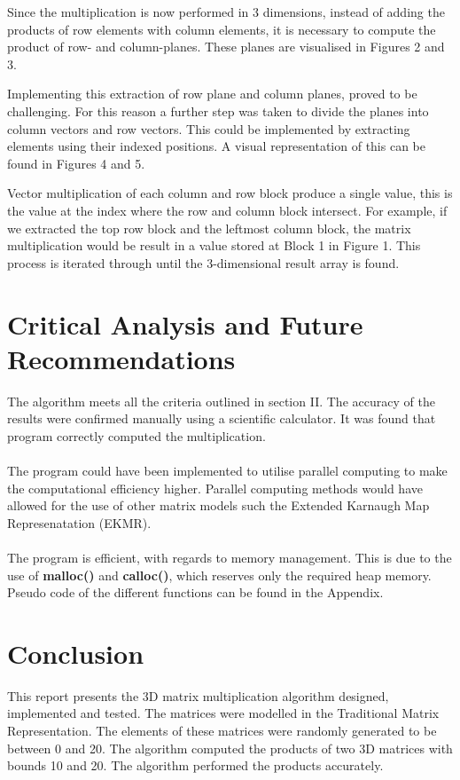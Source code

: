 \documentclass[a4paper, 11pt, onecolumn, conference]{IEEEtran}      %
\begin{document}
Since the multiplication is now performed in 3 dimensions, instead of adding the products of row elements with column elements, it is necessary to compute the product of row- and column-planes. These planes are visualised in Figures 2 and 3.


Implementing this extraction of row plane and column planes, proved to be challenging. For this reason a further step was taken to divide the planes into column vectors and row vectors. This could be implemented by extracting elements using their indexed positions. A visual representation of this can be found in Figures 4 and 5.


Vector multiplication of each column and row block produce a single value, this is the value at the index where the row and column block intersect. For example, if we extracted the top row block and the leftmost column block, the matrix multiplication would be result in a value stored at Block 1 in Figure 1. This process is iterated through until the 3-dimensional result array is found.

\section{Critical Analysis and Future Recommendations}
The algorithm meets all the criteria outlined in section II. The accuracy of the results were confirmed manually using a scientific calculator. It was found that program correctly computed the multiplication.\\\\
The program could have been implemented to utilise parallel computing to make the computational efficiency higher. Parallel computing methods would have allowed for the use of other matrix models such the Extended Karnaugh Map Represenatation (EKMR).\\\\
The program is efficient, with regards to memory management. This is due to the use of \textbf{malloc()} and \textbf{calloc()}, which reserves only the required heap memory. \\

Pseudo code of the different functions can be found in the Appendix.

\section{Conclusion}
This report presents the 3D matrix multiplication algorithm designed, implemented and tested. The matrices were modelled in the Traditional Matrix Representation. The elements of these matrices were randomly generated to be between 0 and 20. The algorithm computed the products of two 3D matrices with bounds 10 and 20. The algorithm performed the products accurately. 
\end{document}
